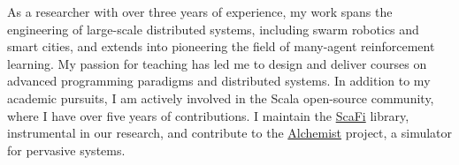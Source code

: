 
\begin{cvparagraph}

As a researcher with over three years of experience, my work spans the engineering of large-scale distributed systems, including swarm robotics and smart cities, and extends into pioneering the field of many-agent reinforcement learning. My passion for teaching has led me to design and deliver courses on advanced programming paradigms and distributed systems. In addition to my academic pursuits, I am actively involved in the Scala open-source community, where I have over five years of contributions. I maintain the \href{http://scafi.github.io/}{\url{ScaFi}} library, instrumental in our research, and contribute to the \href{http://alchemistsimulator.github.io/}{\url{Alchemist}} project, a simulator for pervasive systems.

\end{cvparagraph}
